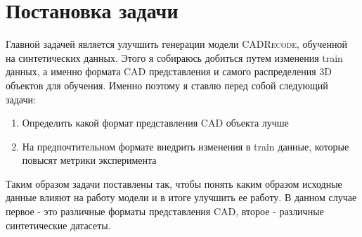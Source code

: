 \section{Постановка задачи}
\label{sec:Chapter1} 

Главной задачей является улучшить генерации модели \textsc{CADRecode}, обученной на синтетических данных. Этого я собираюсь добиться путем изменения train данных,
а именно формата CAD представления и самого распределения 3D объектов для обучения.
Именно поэтому я ставлю перед собой следующий задачи:
\begin{enumerate}
	\item Определить какой формат представления CAD объекта лучше
	\item На предпочтительном формате внедрить изменения в train данные, которые повысят метрики эксперимента
\end{enumerate}

Таким образом задачи поставлены так, чтобы понять каким образом исходные данные влияют на работу модели и в итоге улучшить ее работу.
В данном случае первое - это различные форматы представления CAD, второе - различные синтетические датасеты.

\newpage
